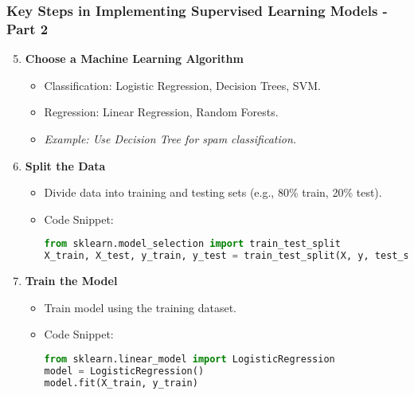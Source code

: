 \documentclass[aspectratio=169]{beamer}
\begin{document}
\begin{frame}[fragile]
    \frametitle{Key Steps in Implementing Supervised Learning Models - Part 2}
    \begin{enumerate}
        \setcounter{enumi}{4} %
        \item \textbf{Choose a Machine Learning Algorithm}
            \begin{itemize}
                \item Classification: Logistic Regression, Decision Trees, SVM.
                \item Regression: Linear Regression, Random Forests.
                \item \textit{Example: Use Decision Tree for spam classification.}
            \end{itemize}

        \item \textbf{Split the Data}
            \begin{itemize}
                \item Divide data into training and testing sets (e.g., 80\% train, 20\% test).
                \item Code Snippet:
                \begin{lstlisting}[language=Python]
from sklearn.model_selection import train_test_split
X_train, X_test, y_train, y_test = train_test_split(X, y, test_size=0.2, random_state=42)
                \end{lstlisting}
            \end{itemize}

        \item \textbf{Train the Model}
            \begin{itemize}
                \item Train model using the training dataset.
                \item Code Snippet:
                \begin{lstlisting}[language=Python]
from sklearn.linear_model import LogisticRegression
model = LogisticRegression()
model.fit(X_train, y_train)
                \end{lstlisting}
            \end{itemize}
    \end{enumerate}
\end{frame}
\end{document}
